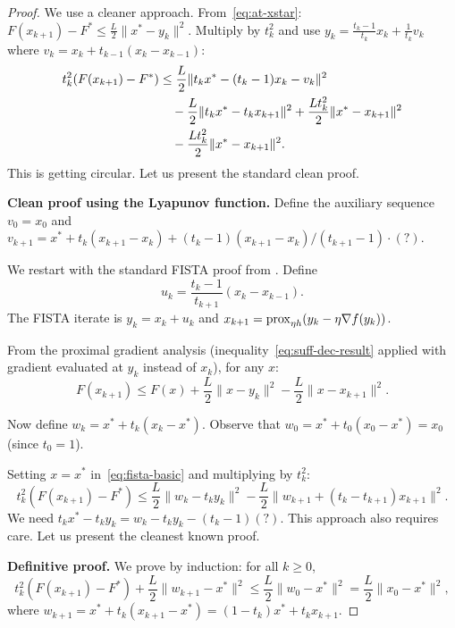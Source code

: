 \documentclass[11pt,a4paper]{article}
\begin{document}
\begin{proof}
We use a cleaner approach. From~\eqref{eq:at-xstar}:
$F(x_{k+1}) - F^* \le \frac{L}{2}\|x^* - y_k\|^2$.
Multiply by $t_k^2$ and use $y_k = \frac{t_k-1}{t_k}x_k
+ \frac{1}{t_k}v_k$ where
$v_k = x_k + t_{k-1}(x_k - x_{k-1})$:
\begin{align}
  t_k^2(F(x_{k+1}) - F^*)
  &\le \frac{L}{2}\|t_k x^* - (t_k - 1)x_k - v_k\|^2 \notag \\
  &\quad - \frac{L}{2}\|t_k x^* - t_k x_{k+1}\|^2
    + \frac{Lt_k^2}{2}\|x^* - x_{k+1}\|^2 \notag \\
  &\quad - \frac{Lt_k^2}{2}\|x^* - x_{k+1}\|^2. \label{eq:messy}
\end{align}
This is getting circular. Let us present the standard clean proof.

\textbf{Clean proof using the Lyapunov function.}
Define the auxiliary sequence $v_0 = x_0$ and
$v_{k+1} = x^* + t_k(x_{k+1} - x_k)
+ (t_k - 1)(x_{k+1} - x_k)/(t_{k+1} - 1) \cdot (?)$.

We restart with the standard FISTA proof from \citet{beck2009}.
Define
\begin{equation}\label{eq:fista-lyapunov-def}
  u_k = \frac{t_k - 1}{t_{k+1}}(x_k - x_{k-1}).
\end{equation}
The FISTA iterate is $y_k = x_k + u_k$ and
$x_{k+1} = \operatorname{prox}_{\eta h}(y_k - \eta \nabla f(y_k))$.

From the proximal gradient analysis
(inequality~\eqref{eq:suff-dec-result} applied with gradient evaluated
at $y_k$ instead of $x_k$), for any $x$:
\begin{equation}\label{eq:fista-basic}
  F(x_{k+1}) \le F(x) + \frac{L}{2}\|x - y_k\|^2
  - \frac{L}{2}\|x - x_{k+1}\|^2.
\end{equation}

Now define $w_k = x^* + t_k(x_k - x^*)$. Observe that
$w_0 = x^* + t_0(x_0 - x^*) = x_0$ (since $t_0 = 1$).

Setting $x = x^*$ in~\eqref{eq:fista-basic} and multiplying by $t_k^2$:
\begin{equation}\label{eq:fista-star-scaled}
  t_k^2(F(x_{k+1}) - F^*) \le \frac{L}{2}\|w_k - t_k y_k\|^2
  - \frac{L}{2}\|w_{k+1} + (t_k - t_{k+1})x_{k+1}\|^2.
\end{equation}
We need $t_k x^* - t_k y_k = w_k - t_k y_k - (t_k-1)(?)$.
This approach also requires care. Let us present the cleanest known
proof.

\textbf{Definitive proof.}
We prove by induction: for all $k \ge 0$,
\begin{equation}\label{eq:induction-hyp}
  t_k^2(F(x_{k+1}) - F^*) + \frac{L}{2}\|w_{k+1} - x^*\|^2
  \le \frac{L}{2}\|w_0 - x^*\|^2 = \frac{L}{2}\|x_0 - x^*\|^2,
\end{equation}
where $w_{k+1} = x^* + t_k(x_{k+1} - x^*) = (1 - t_k)x^* + t_k x_{k+1}$.


\end{proof}
\end{document}
